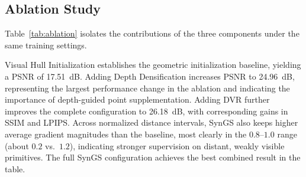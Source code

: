 \subsection{Ablation Study}
\label{sec:ablation}

Table~\ref{tab:ablation} isolates the contributions of the three components under the same training settings.



Visual Hull Initialization establishes the geometric initialization baseline, yielding a PSNR of 17.51~dB. Adding Depth Densification increases PSNR to 24.96~dB, representing the largest performance change in the ablation and indicating the importance of depth-guided point supplementation. Adding DVR further improves the complete configuration to 26.18~dB, with corresponding gains in SSIM and LPIPS. Across normalized distance intervals, SynGS also keeps higher average gradient magnitudes than the baseline, most clearly in the $0.8$--$1.0$ range (about $0.2$ vs.\ $1.2$), indicating stronger supervision on distant, weakly visible primitives. The full SynGS configuration achieves the best combined result in the table.
